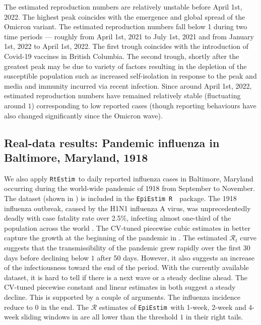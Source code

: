 \documentclass[10pt,letterpaper]{article}
\newcommand{\R}{\texttt{R}\ }
\def\RtEstim{\texttt{RtEstim}}
\def\EpiEstim{\texttt{EpiEstim}}
\def\calR{\mathcal{R}}
\newcommand{\citep}[1]{\cite{#1}}
\begin{document}
The estimated reproduction numbers are relatively unstable before April 1st,
2022. The highest peak coincides with the emergence and global spread of the
Omicron variant. The estimated reproduction numbers fall below 1 during two time
periods --- roughly from April 1st, 2021 to July 1st, 2021 and from January 1st,
2022 to April 1st, 2022. The first trough coincides with the introduction of
Covid-19 vaccines in British Columbia. The second trough, shortly after the
greatest peak may be due to variety of factors resulting in the depletion of the
susceptible population such as increased self-isolation in response to the peak
and media and immunity incurred via recent infection. Since around April 1st,
2022, estimated reproduction numbers have remained relatively stable
(fluctuating around $1$) corresponding to low reported cases (though reporting
behaviours have also changed significantly since the Omicron wave). 


\subsection{Real-data results: Pandemic influenza in Baltimore, Maryland, 1918}

We also apply \RtEstim\ to daily reported influenza cases in Baltimore, Maryland
occurring during the world-wide pandemic of 1918 from September to November. 
The dataset (shown in ) is included in the \EpiEstim\ 
\R\ package. The 1918 influenza outbreak, caused by the H1N1 influenza A virus, 
was unprecedentedly deadly with case fatality rate over 2.5\%, infecting almost 
one-third of the population across the world \citep{taubenberger20061918}. 
The CV-tuned piecewise cubic estimates in \nameref{fig:flu-res} better capture 
the growth at the beginning of the pandemic in \nameref{fig:flu-dat}. 
The estimated $\calR_t$ curve suggests that the transmissibility of the pandemic 
grew rapidly over the first 30 days before declining below $1$ after 50 days. 
However, it also suggests an increase of the infectiousness toward the end of the 
period. With the currently available dataset, it is hard to tell if there is a 
next wave or a steady decline ahead. The CV-tuned piecewise constant and linear 
estimates in \nameref{fig:flu-res} both suggest a steady decline. This is supported 
by a couple of arguments. The influenza incidence reduce to $0$ in the end. 
The $\calR$ estimates of \EpiEstim\ with 1-week, 2-week and 4-week sliding windows 
in \cite{cori2013new} are all lower than the threshold $1$ in their right tails. 
\end{document}
